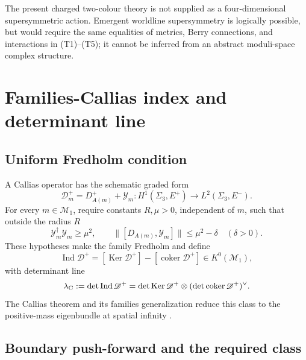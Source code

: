 \documentclass[11pt]{article}
\theoremstyle{definition}
\theoremstyle{remark}
\newcommand{\cM}{\mathcal M}
\newcommand{\Ind}{\operatorname{Ind}}
\newcommand{\Ker}{\operatorname{Ker}}
\begin{document}
The present charged two-colour theory is not supplied as a four-dimensional
supersymmetric action.  Emergent worldline supersymmetry is logically
possible, but would require the same equalities of metrics, Berry
connections, and interactions in (T1)--(T5); it cannot be inferred from an
abstract moduli-space complex structure.

\section{Families-Callias index and determinant line}

\subsection{Uniform Fredholm condition}

A Callias operator has the schematic graded form
\begin{equation}
 \mathscr D_m^+
 =D_{A(m)}^++\mathscr Y_m:
 H^1(\Sigma_3,E^+)\longrightarrow L^2(\Sigma_3,E^-).
 \label{eq:callias-operator}
\end{equation}
For every \(m\in\cM_1\), require constants \(R,\mu>0\), independent of
\(m\), such that outside the radius \(R\)
\begin{equation}
 \mathscr Y_m^\dagger\mathscr Y_m\ge\mu^2,
 \qquad
 \bigl\|[D_{A(m)},\mathscr Y_m]\bigr\|\le\mu^2-\delta
 \quad(\delta>0).
 \label{eq:uniform-callias}
\end{equation}
These hypotheses make the family Fredholm and define
\begin{equation}
 \Ind\mathscr D^+
 =[\Ker\mathscr D^+]-[\operatorname{coker}\mathscr D^+]
 \in K^0(\cM_1),
 \label{eq:index-bundle}
\end{equation}
with determinant line
\begin{equation}
 \lambda_{\rm C}
 :=\det\Ind\mathscr D^+
 =\det\Ker\mathscr D^+\otimes
 (\det\operatorname{coker}\mathscr D^+)^\vee.
 \label{eq:determinant-line}
\end{equation}
The Callias theorem and its families generalization reduce this class to the
positive-mass eigenbundle at spatial infinity
\cite{Callias1978SameSoliton,Kottke2011SameSoliton,VanDenDungen2024SameSoliton}.

\subsection{Boundary push-forward and the required class}
\end{document}
